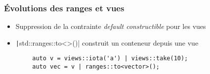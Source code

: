\documentclass[C++.tex]{subfiles}
\begin{document}
\begin{frame}[fragile]
	\frametitle{Évolutions des ranges et vues}
	\begin{itemize}
		\item Suppression de la contrainte \textit{default constructible} pour les vues
		\item \texttt|std::ranges::to<>()| construit un conteneur depuis une vue
	\end{itemize}

	\begin{verbatim}
		auto v = views::iota('a') | views::take(10);
		auto vec = v | ranges::to<vector>();
	\end{verbatim}


\end{frame}
\end{document}
